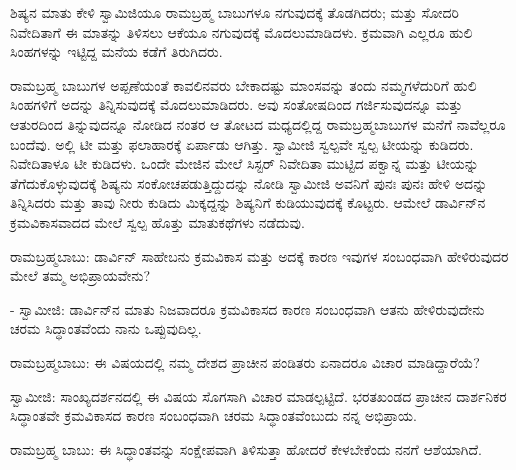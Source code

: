 ಶಿಷ್ಯನ ಮಾತು ಕೇಳಿ ಸ್ವಾಮಿಜಿಯೂ ರಾಮಬ್ರಹ್ಮ ಬಾಬುಗಳೂ ನಗುವುದಕ್ಕೆ ತೊಡಗಿದರು; ಮತ್ತು ಸೋದರಿ ನಿವೇದಿತಾಗೆ ಈ ಮಾತನ್ನು ತಿಳಿಸಲು ಆಕೆಯೂ ನಗುವುದಕ್ಕೆ ಮೊದಲುಮಾಡಿದಳು. ಕ್ರಮವಾಗಿ ಎಲ್ಲರೂ ಹುಲಿ ಸಿಂಹಗಳನ್ನು ಇಟ್ಟಿದ್ದ ಮನೆಯ ಕಡೆಗೆ ತಿರುಗಿದರು.

ರಾಮಬ್ರಹ್ಮ ಬಾಬುಗಳ ಅಪ್ಪಣೆಯಂತೆ ಕಾವಲಿನವರು ಬೇಕಾದಷ್ಟು ಮಾಂಸವನ್ನು ತಂದು ನಮ್ಮಗಳೆದುರಿಗೆ ಹುಲಿ ಸಿಂಹಗಳಿಗೆ ಅದನ್ನು ತಿನ್ನಿಸುವುದಕ್ಕೆ ಮೊದಲುಮಾಡಿದರು. ಅವು ಸಂತೋಷದಿಂದ ಗರ್ಜಿಸುವುದನ್ನೂ ಮತ್ತು ಆತುರದಿಂದ ತಿನ್ನುವುದನ್ನೂ ನೋಡಿದ ನಂತರ ಆ ತೋಟದ ಮಧ್ಯದಲ್ಲಿದ್ದ ರಾಮಬ್ರಹ್ಮಬಾಬುಗಳ ಮನೆಗೆ ನಾವೆಲ್ಲರೂ ಬಂದೆವು. ಅಲ್ಲಿ ಟೀ ಮತ್ತು ಫಲಾಹಾರಕ್ಕೆ ಏರ್ಪಾಡು ಆಗಿತ್ತು. ಸ್ವಾಮೀಜಿ ಸ್ವಲ್ಪವೇ ಸ್ವಲ್ಪ ಟೀಯನ್ನು ಕುಡಿದರು. ನಿವೇದಿತಾಳೂ ಟೀ ಕುಡಿದಳು. ಒಂದೇ ಮೇಜಿನ ಮೇಲೆ ಸಿಸ್ಟರ್ ನಿವೇದಿತಾ ಮುಟ್ಟಿದ ಪಕ್ವಾನ್ನ ಮತ್ತು ಟೀಯನ್ನು ತೆಗೆದುಕೊಳ್ಳುವುದಕ್ಕೆ ಶಿಷ್ಯನು ಸಂಕೋಚಪಡುತ್ತಿದ್ದುದನ್ನು ನೋಡಿ ಸ್ವಾಮೀಜಿ ಅವನಿಗೆ ಪುನಃ ಪುನಃ ಹೇಳಿ ಅದನ್ನು ತಿನ್ನಿಸಿದರು ಮತ್ತು ತಾವು ನೀರು ಕುಡಿದು ಮಿಕ್ಕದ್ದನ್ನು ಶಿಷ್ಯನಿಗೆ ಕುಡಿಯುವುದಕ್ಕೆ ಕೊಟ್ಟರು. ಆಮೇಲೆ ಡಾರ್ವಿನ್‌ನ ಕ್ರಮವಿಕಾಸವಾದದ ಮೇಲೆ ಸ್ವಲ್ಪ ಹೊತ್ತು ಮಾತುಕಥೆಗಳು ನಡೆದುವು.

ರಾಮಬ್ರಹ್ಮಬಾಬು: ಡಾರ್ವಿನ್ ಸಾಹೇಬನು ಕ್ರಮವಿಕಾಸ ಮತ್ತು ಅದಕ್ಕೆ ಕಾರಣ ಇವುಗಳ ಸಂಬಂಧವಾಗಿ ಹೇಳಿರುವುದರ ಮೇಲೆ ತಮ್ಮ ಅಭಿಪ್ರಾಯವೇನು?

- ಸ್ವಾಮೀಜಿ: ಡಾರ್ವಿನ್‌ನ ಮಾತು ನಿಜವಾದರೂ ಕ್ರಮವಿಕಾಸದ ಕಾರಣ ಸಂಬಂಧವಾಗಿ ಆತನು ಹೇಳಿರುವುದೇನು ಚರಮ ಸಿದ್ಧಾಂತವೆಂದು ನಾನು ಒಪ್ಪುವುದಿಲ್ಲ.

ರಾಮಬ್ರಹ್ಮಬಾಬು: ಈ ವಿಷಯದಲ್ಲಿ ನಮ್ಮ ದೇಶದ ಪ್ರಾಚೀನ ಪಂಡಿತರು ಏನಾದರೂ ವಿಚಾರ ಮಾಡಿದ್ದಾರೆಯೆ?

ಸ್ವಾಮೀಜಿ: ಸಾಂಖ್ಯದರ್ಶನದಲ್ಲಿ ಈ ವಿಷಯ ಸೊಗಸಾಗಿ ವಿಚಾರ ಮಾಡಲ್ಪಟ್ಟಿದೆ. ಭರತಖಂಡದ ಪ್ರಾಚೀನ ದಾರ್ಶನಿಕರ ಸಿದ್ಧಾಂತವೇ ಕ್ರಮವಿಕಾಸದ ಕಾರಣ ಸಂಬಂಧವಾಗಿ ಚರಮ ಸಿದ್ಧಾಂತವೆಂಬುದು ನನ್ನ ಅಭಿಪ್ರಾಯ.

ರಾಮಬ್ರಹ್ಮ ಬಾಬು: ಈ ಸಿದ್ಧಾಂತವನ್ನು ಸಂಕ್ಷೇಪವಾಗಿ ತಿಳಿಸುತ್ತಾ ಹೋದರೆ ಕೇಳಬೇಕೆಂದು ನನಗೆ ಆಶೆಯಾಗಿದೆ.

